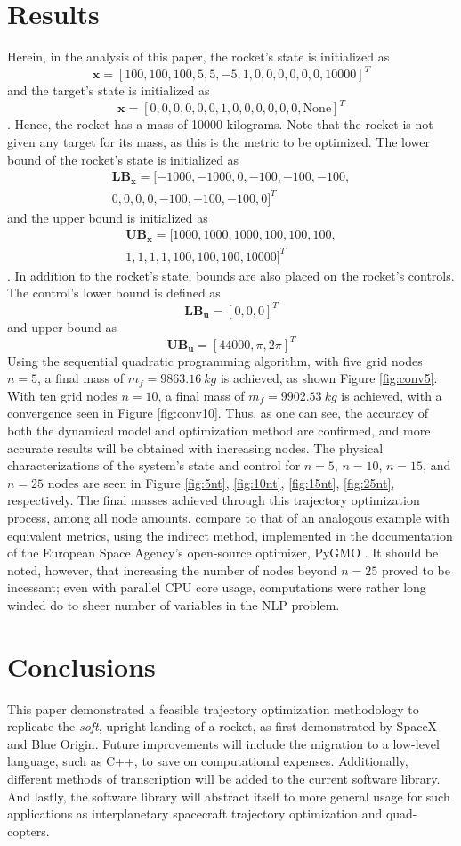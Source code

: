 \documentclass{article}
\begin{document}
\section{Results}
Herein, in the analysis of this paper, the rocket's state is initialized as
$$
\mathbf{x}=[100,100,100,5,5,-5,1,0,0,0,0,0,0,10000]^T
$$
and the target's state is initialized as
$$
\mathbf{x}=[0,0,0,0,0,0,1,0,0,0,0,0,0,\text{None}]^T
$$.
Hence, the rocket has a mass of 10000 kilograms.
Note that the rocket is not given any target for its mass, as this is the metric to be optimized. The lower bound of the rocket's state is initialized as 
\begin{multline*}
\mathbf{LB}_\mathbf{x} = [-1000,-1000,0,-100,-100,-100,\\0,0,0,0,-100,-100,-100,0]^T
\end{multline*}
and the upper bound is initialized as
\begin{multline*}
\mathbf{UB}_\mathbf{x} = [1000,1000,1000,100,100,100,\\1,1,1,1,100,100,100,10000]^T
\end{multline*}.
In addition to the rocket's state, bounds are also placed on the rocket's controls. The control's lower bound is defined as
$$
\mathbf{LB}_\mathbf{u} = [0,0,0]^T
$$
and upper bound as
$$
\mathbf{UB}_\mathbf{u} = [44000,\pi,2\pi]^T
$$
Using the sequential quadratic programming algorithm, with five grid nodes $n=5$, a final mass of $m_f = 9863.16~kg$ is achieved, as shown Figure \ref{fig:conv5}. With ten grid nodes $n=10$, a final mass of $m_f=9902.53~kg$ is achieved, with a convergence seen in Figure \ref{fig:conv10}. Thus, as one can see, the accuracy of both the dynamical model and optimization method are confirmed, and more accurate results will be obtained with increasing nodes. The physical characterizations of the system's state and control for $n=5$, $n=10$, $n=15$, and $n=25$ nodes are seen in Figure \ref{fig:5nt}, \ref{fig:10nt}, \ref{fig:15nt}, \ref{fig:25nt}, respectively. The final masses achieved through this trajectory optimization process, among all node amounts, compare to that of an analogous example with equivalent metrics, using the indirect method, implemented in the documentation of the European Space Agency's open-source optimizer, PyGMO \cite{Izzo2012}. It should be noted, however, that increasing the number of nodes beyond $n=25$ proved to be incessant; even with parallel CPU core usage, computations were rather long winded do to sheer number of variables in the NLP problem.

\section{Conclusions}
This paper demonstrated a feasible trajectory optimization methodology to replicate the \textit{soft}, upright landing of a rocket, as first demonstrated by SpaceX and Blue Origin. Future improvements will include the migration to a low-level language, such as C++, to save on computational expenses. Additionally, different methods of transcription will be added to the current software library. And lastly, the software library will abstract itself to more general usage for such applications as interplanetary spacecraft trajectory optimization and quad-copters.
\end{document}
